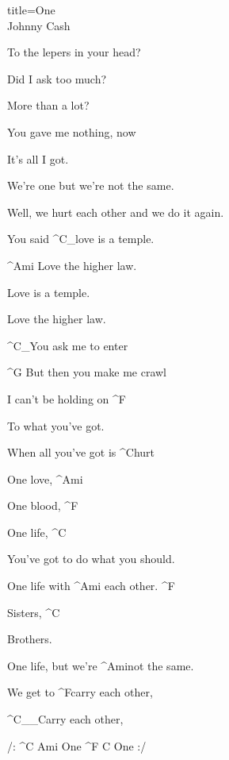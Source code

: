 \begin{song}{title=\centering One \\\normalsize Johnny Cash  \vspace*{-0.3cm}}
{\begin{minipage}[t]{0.55\textwidth}
	To the lepers in your head?


\end{minipage}\begin{minipage}[t]{0.55\textwidth}\setlength{\parindent}{0.45cm}\vspace*{0.55cm}  %


	Did I ask too much? 

	More than a lot?

	You gave me nothing, now
	   
	It's all I got.

	We're one but we're not the same.

	Well, we hurt each other and we do it again. 
 
	You said ^{C{\color{white}\_}}love is a temple.

	^{Ami\,\,}Love the higher law.

	Love is a temple.	

	Love the higher law.

	^{C{\color{white}\_}}You ask me to enter

	^{G\,\,}But then you make me crawl

	I can't be holding on ^{F}
                  
	To what you've got.

	When all you've got is ^{C}hurt
  
	One love, ^{Ami}

	One blood, ^{F}

	One life, ^{C}
 
	You've got to do what you should.

	One life with ^{Ami\,\,}each other. ^{F}
 
 	Sisters, ^{C}
 
	Brothers.
   
	One life, but we're ^{Ami}not the same.

	We get to ^{F}carry each other,

  	^{C{\color{white}\_\_}}Carry each other,

  	/: ^{C\,\,Ami\,\,}One ^{F\,\,C\,\,}One :/


\normalsize


\end{minipage}
}
\setcounter{Slokočet}{0}
\end{song}
